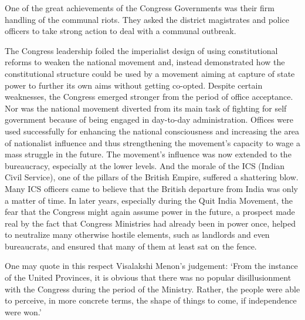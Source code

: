 \begin{multicols}{2}
One of the great achievements of the Congress Governments was their firm handling of the communal riots. They asked the district magistrates and police officers to take strong action to deal with a communal outbreak.

The Congress leadership foiled the imperialist design of using constitutional reforms to weaken the national movement and, instead demonstrated how the constitutional structure could be used by a movement aiming at capture of state power to further its own aims without getting co-opted. Despite certain weaknesses, the Congress emerged stronger from the period of office acceptance. Nor was the national movement diverted from its main task of fighting for self government because of being engaged in day-to-day administration. Offices were used successfully for enhancing the national consciousness and increasing the area of nationalist influence and thus strengthening the movement's capacity to wage a mass struggle in the future. The movement's influence was now extended to the bureaucracy, especially at the lower levels. And the morale of the ICS (Indian Civil Service), one of the pillars of the British Empire, suffered a shattering blow. Many ICS officers came to believe that the British departure from India was only a matter of time. In later years, especially during the Quit India Movement, the fear that the Congress might again assume power in the future, a prospect made real by the fact that Congress Ministries had already been in power once, helped to neutralize many otherwise hostile elements, such as landlords and even bureaucrats, and ensured that many of them at least sat on the fence.

One may quote in this respect Visalakshi Menon's judgement: `From the instance of the United Provinces, it is obvious that there was no popular disillusionment with the Congress during the period of the Ministry. Rather, the people were able to perceive, in more concrete terms, the shape of things to come, if independence were won.'


\end{multicols}
